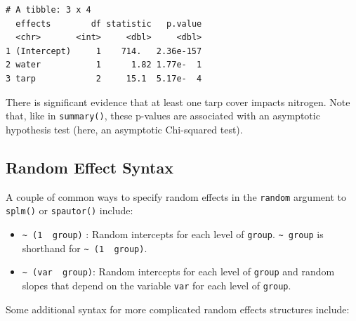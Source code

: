\documentclass{article}
\providecommand{\tightlist}{%
  \setlength{\itemsep}{0pt}\setlength{\parskip}{0pt}}
\begin{document}
\begin{verbatim}
# A tibble: 3 x 4
  effects        df statistic   p.value
  <chr>       <int>     <dbl>     <dbl>
1 (Intercept)     1    714.   2.36e-157
2 water           1      1.82 1.77e-  1
3 tarp            2     15.1  5.17e-  4
\end{verbatim}

There is significant evidence that at least one tarp cover impacts
nitrogen. Note that, like in \texttt{summary()}, these p-values are
associated with an asymptotic hypothesis test (here, an asymptotic
Chi-squared test).

\hypertarget{app:rand}{%
\subsection{Random Effect Syntax}\label{app:rand}}

A couple of common ways to specify random effects in the \texttt{random}
argument to \texttt{splm()} or \texttt{spautor()} include:

\begin{itemize}
\tightlist
\item
  \texttt{\textasciitilde{}\ (1\ \textbar{}\ group)} : Random intercepts
  for each level of \texttt{group}. \texttt{\textasciitilde{}\ group} is
  shorthand for \texttt{\textasciitilde{}\ (1\ \textbar{}\ group)}.
\item
  \texttt{\textasciitilde{}\ (var\ \textbar{}\ group)}: Random
  intercepts for each level of \texttt{group} and random slopes that
  depend on the variable \texttt{var} for each level of \texttt{group}.
\end{itemize}

Some additional syntax for more complicated random effects structures
include:
\end{document}
